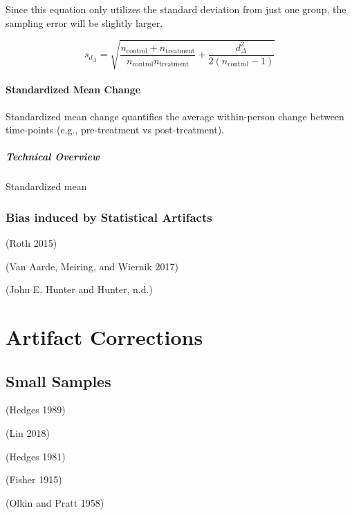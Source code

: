 \documentclass[
  letterpaper,
  DIV=11,
  numbers=noendperiod]{scrreprt}
\begin{document}
Since this equation only utilizes the standard deviation from just one
group, the sampling error will be slightly larger.

\[
s_{d_\Delta} = \sqrt{ \frac{n_\text{control} + n_\text{treatment}}{n_\text{control}n_\text{treatment}} + \frac{d_{\Delta}^2}{2(n_{\text{control}}-1)}}
\]

\hypertarget{standardized-mean-change}{%
\subsection{Standardized Mean Change}\label{standardized-mean-change}}

Standardized mean change quantifies the average within-person change
between time-points (e.g., pre-treatment vs post-treatment).

\hypertarget{technical-overview-2}{%
\subsubsection*{Technical Overview}\label{technical-overview-2}}

Standardized mean

\hypertarget{bias-induced-by-statistical-artifacts}{%
\section{Bias induced by Statistical
Artifacts}\label{bias-induced-by-statistical-artifacts}}

(Roth 2015)

(Van Aarde, Meiring, and Wiernik 2017)

(John E. Hunter and Hunter, n.d.)

\part{Artifact Corrections}

\hypertarget{small-samples}{%
\chapter{Small Samples}\label{small-samples}}

(Hedges 1989)

(Lin 2018)

(Hedges 1981)

(Fisher 1915)

(Olkin and Pratt 1958)
\end{document}
